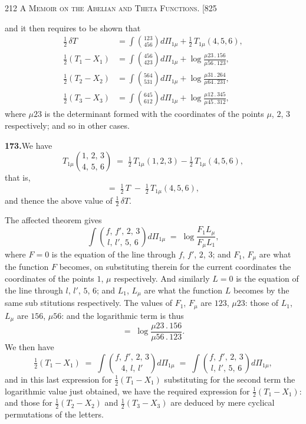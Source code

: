 \documentclass[11pt]{article}
\begin{document}
\newpage
\noindent\textsc{212 \hfill A Memoir on the Abelian and Theta Functions. \hfill [825}
\vspace{0.6em}

\noindent
and it then requires to be shown that
\begin{align*}
\tfrac{1}{2}\,\delta T          &= \int\!\binom{123}{456}d\Pi_{1\mu}+\tfrac{1}{2}\,T_{1\mu}(4,5,6),\\
\tfrac{1}{2}(T_{1}-X_{1}) &= \int\!\binom{456}{423}d\Pi_{1\mu}+\log\frac{\mu23\,.\,156}{\mu56\,.\,123},\\
\tfrac{1}{2}(T_{2}-X_{2}) &= \int\!\binom{564}{531}d\Pi_{1\mu}+\log\frac{\mu31\,.\,264}{\mu64\,.\,231},\\
\tfrac{1}{2}(T_{3}-X_{3}) &= \int\!\binom{645}{612}d\Pi_{1\mu}+\log\frac{\mu12\,.\,345}{\mu45\,.\,312},
\end{align*}
where $\mu23$ is the determinant formed with the coordinates of the points $\mu$, $2$, $3$
respectively; and so in other cases.

\medskip
\textbf{173.}\quad We have
\[
T_{1\mu}\binom{1,\,2,\,3}{4,\,5,\,6} \;=\; \tfrac{1}{2}\,T_{1\mu}(1,2,3) - \tfrac{1}{2}\,T_{1\mu}(4,5,6),
\]
that is,
\[
=\;\tfrac{1}{2}\,T \;-\;\tfrac{1}{2}\,T_{1\mu}(4,5,6),
\]
and thence the above value of $\tfrac{1}{2}\,\delta T$.

The affected theorem gives
\[
\int\!\binom{f,\,f'\!,\,2,\,3}{l,\,l'\!,\,5,\,6}d\Pi_{1\mu} \;=\; \log\frac{F_{1}L_{\mu}}{F_{\mu}L_{1}},
\]
where $F=0$ is the equation of the line through $f$, $f'$, $2$, $3$; and $F_{1}$, $F_{\mu}$ are what the
function $F$ becomes, on substituting therein for the current coordinates the coordinates
of the points $1$, $\mu$ respectively.  And similarly $L=0$ is the equation of the line
through $l$, $l'$, $5$, $6$; and $L_{1}$, $L_{\mu}$ are what the function $L$ becomes by the same sub\-
stitutions respectively. The values of $F_{1}$, $F_{\mu}$ are $123$, $\mu23$: those of $L_{1}$, $L_{\mu}$ are $156$,
$\mu56$: and the logarithmic term is thus
\[
=\;\log\frac{\mu23\,.\,156}{\mu56\,.\,123}.
\]
We then have
\[
\tfrac{1}{2}(T_{1}-X_{1}) \;=\; \int\!\binom{f,\,f'\!,\,2,\,3}{4,\,l,\,l'} d\Pi_{1\mu}
   \;=\; \int\!\binom{f,\,f'\!,\,2,\,3}{l,\,l'\!,\,5,\,6}d\Pi_{1\mu},
\]
and in this last expression for $\tfrac{1}{2}(T_{1}-X_{1})$ substituting for the second term the
logarithmic value just obtained, we have the required expression for $\tfrac{1}{2}(T_{1}-X_{1})$: and
those for $\tfrac{1}{2}(T_{2}-X_{2})$ and $\tfrac{1}{2}(T_{3}-X_{3})$ are deduced by mere cyclical permutations of the
letters.
\end{document}
